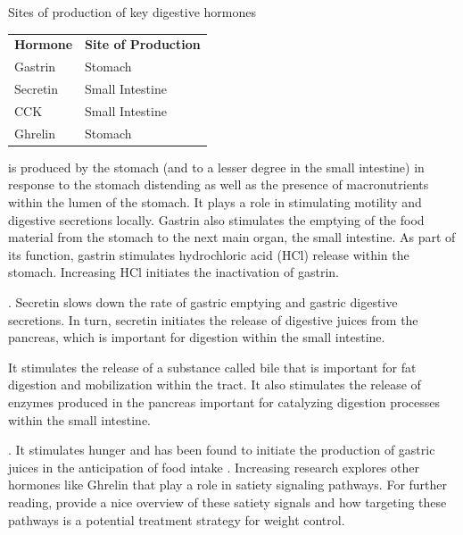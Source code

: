 \documentclass{tufte-handout}
\begin{document}
\begin{margintable}
\caption{Sites of production of key digestive hormones}\label{tab:gi-hormones}
\begin{tabular}{ll}
\textbf{Hormone} & \textbf{Site of Production} \\
Gastrin          & Stomach                     \\
Secretin         & Small Intestine             \\
CCK              & Small Intestine             \\
Ghrelin          & Stomach                    
\end{tabular}
\end{margintable}

 is produced by the stomach (and to a lesser degree in the small intestine) in response to the stomach distending as well as the presence of macronutrients within the lumen of the stomach. It plays a role in stimulating motility and digestive secretions locally. Gastrin also stimulates the emptying of the food material from the stomach to the next main organ, the small intestine. As part of its function, gastrin stimulates hydrochloric acid (HCl) release within the stomach. Increasing HCl initiates the inactivation of gastrin. 

. Secretin slows down the rate of gastric emptying and gastric digestive secretions. In turn, secretin initiates the release of digestive juices from the pancreas, which is important for digestion within the small intestine. 

 It stimulates the release of a substance called bile that is important for fat digestion and mobilization within the tract. It also stimulates the release of enzymes produced in the pancreas important for catalyzing digestion processes within the small intestine.

. It stimulates hunger and has been found to initiate the production of gastric juices in the anticipation of food intake \citep{Inui2004}. Increasing research explores other hormones like Ghrelin that play a role in satiety signaling pathways. For further reading, \citet{Schwartz2000} provide a nice overview of these satiety signals and how targeting these pathways is a potential treatment strategy for weight control.
\end{document}
